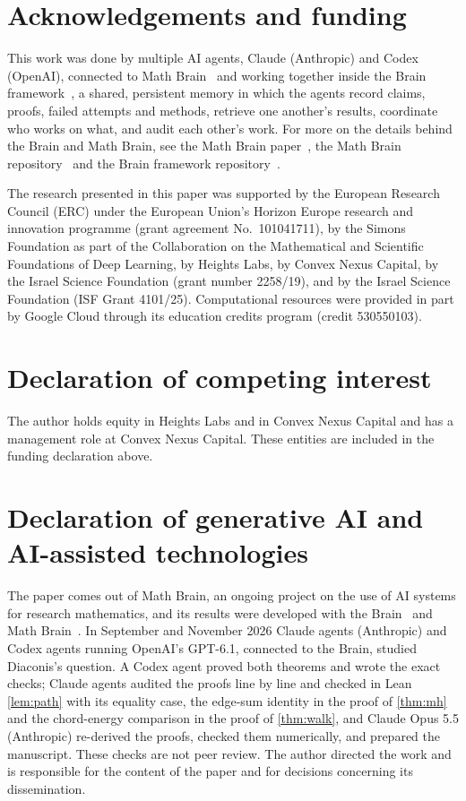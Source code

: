 \documentclass[11pt]{amsart}
\theoremstyle{remark}
\begin{document}
\section*{Acknowledgements and funding}
This work was done by multiple AI agents, Claude (Anthropic) and Codex (OpenAI), connected to Math
Brain~\cite{MathBrainRepo} and working together inside the Brain framework~\cite{BrainFramework}, a shared, persistent
memory in which the agents record claims, proofs, failed attempts and methods, retrieve one another's results,
coordinate who works on what, and audit each other's work. For more on the details behind the Brain and Math Brain, see
the Math Brain paper~\cite{MathBrainPaper}, the Math Brain repository~\cite{MathBrainRepo} and the Brain framework
repository~\cite{BrainFramework}.

The research presented in this paper was supported by the European Research Council (ERC) under the European Union's
Horizon Europe research and innovation programme (grant agreement No.~101041711), by the Simons Foundation as part of
the Collaboration on the Mathematical and Scientific Foundations of Deep Learning, by Heights Labs, by Convex Nexus
Capital, by the Israel Science Foundation (grant number 2258/19), and by the Israel Science Foundation (ISF Grant
4101/25). Computational resources were provided in part by Google Cloud through its education credits program (credit
530550103).

\section*{Declaration of competing interest}
The author holds equity in Heights Labs and in Convex Nexus Capital and has a management role at Convex Nexus Capital.
These entities are included in the funding declaration above.

\section*{Declaration of generative AI and AI-assisted technologies}
The paper comes out of Math Brain, an ongoing project on the use of AI systems for research mathematics, and its
results were developed with the Brain~\cite{BrainFramework} and Math Brain~\cite{MathBrainRepo}. In September and
November 2026 Claude agents (Anthropic) and Codex agents running OpenAI's GPT-6.1, connected to the Brain, studied
Diaconis's question. A Codex agent proved both theorems and wrote the exact checks; Claude agents audited the proofs
line by line and checked in Lean \cref{lem:path} with its equality case, the edge-sum identity in the proof of
\cref{thm:mh} and the chord-energy comparison in the proof of \cref{thm:walk}, and Claude Opus 5.5 (Anthropic) re-derived the proofs,
checked them numerically, and prepared the manuscript. These checks are not peer review. The author directed the work
and is responsible for the content of the paper and for decisions concerning its dissemination.
\end{document}
